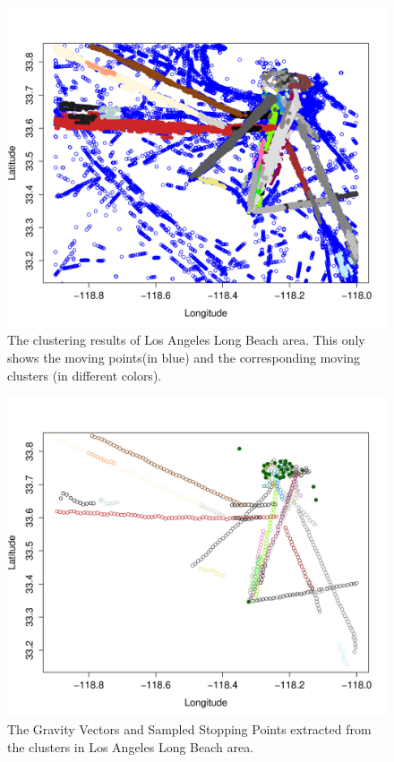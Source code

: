 \documentclass[12pt,glossary]{dalcsthesis}
\begin{document}
\begin{figure}[!htb]
\centering
\includegraphics[width=5in]{LAmoveOrig.png}
\caption{The clustering results of Los Angeles Long Beach area. This only shows the moving points(in blue) and the corresponding moving clusters (in different colors).}
\label{fig:la_movecluster}
\end{figure}

\begin{figure}[!htb]
\centering
\includegraphics[width=5in]{LAclustersGV.jpg}
\caption{The Gravity Vectors and Sampled Stopping Points extracted from the clusters in Los Angeles Long Beach area. }
\label{fig:la_clusters}
\end{figure}
\end{document}
